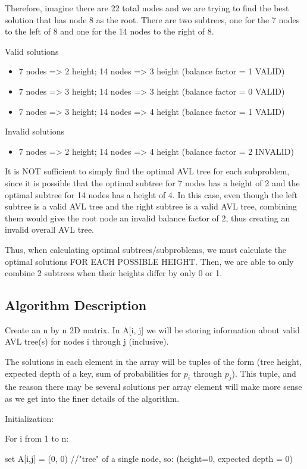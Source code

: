 \documentclass[a4paper]{article}
\begin{document}
Therefore, imagine there are 22 total nodes and we are trying to find the best solution that has node 8 as the root. There are two subtrees, one for the 7 nodes to the left of 8 and one for the 14 nodes to the right of 8.

Valid solutions
\begin{itemize}
    \item 7 nodes => 2 height; 14 nodes => 3 height (balance factor = 1 VALID)
    \item 7 nodes => 3 height; 14 nodes => 3 height (balance factor = 0 VALID)
    \item 7 nodes => 3 height; 14 nodes => 4 height (balance factor = 1 VALID)
\end{itemize}

Invalid solutions
\begin{itemize}
    \item 7 nodes => 2 height; 14 nodes => 4 height (balance factor = 2 INVALID)
\end{itemize}
It is NOT sufficient to simply find the optimal AVL tree for each subproblem, since it is possible that the optimal subtree for 7 nodes has a height of 2 and the optimal subtree for 14 nodes has a height of 4. In this case, even though the left subtree is a valid AVL tree and the right subtree is a valid AVL tree, combining them would give the root node an invalid balance factor of 2, thus creating an invalid overall AVL tree.

Thus, when calculating optimal subtrees/subproblems, we must calculate the optimal solutions FOR EACH POSSIBLE HEIGHT. Then, we are able to only combine 2 subtrees when their heights differ by only 0 or 1.

\subsection{Algorithm Description}

Create an n by n 2D matrix. In A[i, j] we will be storing information about valid AVL tree(s) for nodes i through j (inclusive).

The solutions in each element in the array will be tuples of the form 
(tree height, expected depth of a key, sum of probabilities for $p_i$ through $p_j$).
This tuple, and the reason there may be several solutions per array element will make more sense as we get into the finer details of the algorithm.


Initialization:
\begin{myEnumerate}
\item For i from 1 to n:
    \begin{myEnumerate}
    \item set A[i,j] = (0, 0) //"tree" of a single node, so: (height=0, expected depth = 0)
    \end{myEnumerate}
\end{myEnumerate}
\end{document}
